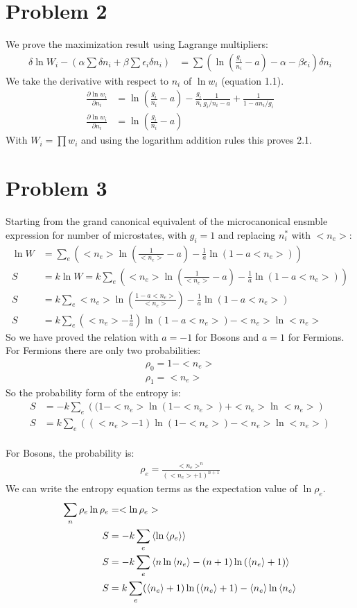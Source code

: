 \documentclass[a4paper,11pt]{article}
\numberwithin{equation}{section}
\begin{document}
\section{Problem 2}
We prove the maximization result using Lagrange multipliers:
\begin{align}
 \delta \ln{W_i}-\left(\alpha\sum \delta n_i+\beta\sum \epsilon_i \delta n_i \right) &= \sum \left(\ln{(\frac{g_i}{n_i}-a)}-\alpha-\beta \epsilon_i \right)\delta n_i
\end{align}
We take the derivative with respect to $n_i$ of $\ln{w_i}$ (equation 1.1).
\begin{align}
 \frac{\partial \ln{w_i}}{\partial n_i} &= \ln{(\frac{g_i}{n_i}-a)}-\frac{g_i}{n_i}\frac{1}{g_i/n_i-a}+\frac{1}{1-an_i/g_i}\\
 \frac{\partial \ln{w_i}}{\partial n_i} &= \ln{(\frac{g_i}{n_i}-a)}
\end{align}
With $W_i=\prod w_i$ and using the logarithm addition rules this proves 2.1.
\
\section{Problem 3}
Starting from the grand canonical equivalent of the microcanonical ensmble expression for number of microstates, with $g_i=1$ and replacing $n_i^*$ with $<n_e>$:
\begin{align}
 \ln{W} &= \sum_e\left(<n_e>\ln{(\frac{1}{<n_e>}-a)}-\frac{1}{a}\ln{(1-a<n_e>)} \right)\\
 S & =k\ln{W} = k \sum_e\left(<n_e>\ln{(\frac{1}{<n_e>}-a)}-\frac{1}{a}\ln{(1-a<n_e>)} \right)\\
 S &= k \sum_e <n_e>\ln{\left(\frac{1-a<n_e>}{<n_e>} \right)}-\frac{1}{a}\ln{(1-a<n_e>)}\\
 S &= k\sum_e \left(<n_e>-\frac{1}{a}\right)\ln{(1-a<n_e>)}-<n_e>\ln{<n_e>}
\end{align}
So we have proved the relation with $a=-1$ for Bosons and $a=1$ for Fermions.
\\
For Fermions there are only two probabilities:
\begin{align}
 \rho_0 = 1-<n_e>\\
 \rho_1 = <n_e>
\end{align}
So the probability form of the entropy is:
\begin{align}
 S &= -k\sum_e \left((1-<n_e>\ln{(1-<n_e>)}+<n_e>\ln{<n_e>}  \right)\\
 S &= k\sum_e \left((<n_e>-1)\ln{(1-<n_e>)}-<n_e>\ln{<n_e>}  \right)
\end{align}
\\
For Bosons, the probability is:
\begin{align}
 \rho_e = \frac{<n_e>^n}{\left(<n_e>+1 \right)^{n+1}}
\end{align}
We can write the entropy equation terms as the expectation value of $\ln{\rho_e}$.
\begin{align}
 \sum_n \rho_e\ln{\rho_e} &= <\ln{\rho_e}>\\
 S &= -k\sum_e \braket{\ln{\braket{\rho_e}}}\\
 S &= -k \sum_e \braket{n\ln{\braket{n_e}}-(n+1)\ln{(\braket{n_e}+1)}}\\ 
 S &= k \sum_e (\braket{n_e}+1)\ln{(\braket{n_e}+1)}-\braket{n_e}\ln{\braket{n_e}}
\end{align}
\end{document}
